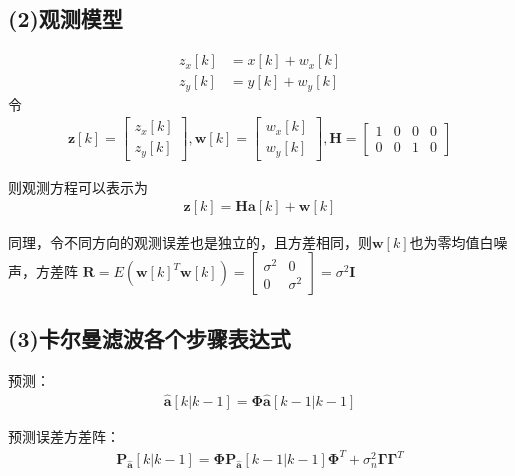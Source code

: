 \documentclass[fontset=windows]{article}
\numberwithin{figure}{section}
\begin{document}
\subsection*{(2)观测模型}

\begin{align*}
    z_x[k] & =x[k]+w_x[k] \\
    z_y[k] & =y[k]+w_y[k]
\end{align*}
令
\begin{align*}
    \mathbf{z}[k]=
    \begin{bmatrix}
        z_x[k] \\
        z_y[k]
    \end{bmatrix},
    \mathbf{w}[k]=
    \begin{bmatrix}
        w_x[k] \\
        w_y[k]
    \end{bmatrix},
    \mathbf{H}=
    \begin{bmatrix}
        1 & 0 & 0 & 0 \\
        0 & 0 & 1 & 0
    \end{bmatrix}
\end{align*}

则观测方程可以表示为
\begin{align}
    \mathbf{z}[k]=\mathbf{Ha}[k]+\mathbf{w}[k]
\end{align}

同理，令不同方向的观测误差也是独立的，且方差相同，则\(\mathbf{w}[k]\)也为零均值白噪声，方差阵
\(\mathbf{R}=E(\mathbf{w}[k]^T\mathbf{w}[k])=\begin{bmatrix}
    \sigma^2 & 0        \\
    0        & \sigma^2
\end{bmatrix}=\sigma^2\mathbf{I}\)

\subsection*{(3)卡尔曼滤波各个步骤表达式}

预测：
\begin{align*}
    \hat{\mathbf{a}}[k|k-1]=\boldsymbol{\Phi}\hat{\mathbf{a}}[k-1|k-1]
\end{align*}

预测误差方差阵：
\begin{align*}
    \mathbf{P}_{\hat{\mathbf{a}}}[k|k-1]=\boldsymbol{\Phi}\mathbf{P}_{\hat{\mathbf{a}}}[k-1|k-1]
    \boldsymbol{\Phi}^T+\sigma^2_n \boldsymbol{\Gamma \Gamma}^T
\end{align*}
\end{document}
